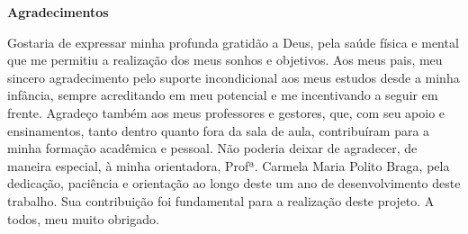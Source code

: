 
\begin{center}
\huge{{\bf Agradecimentos}}
\vspace{4cm}
\end{center}

Gostaria de expressar minha profunda gratidão a Deus, pela saúde física e mental que me permitiu a realização dos meus sonhos e objetivos. Aos meus pais, meu sincero agradecimento pelo suporte incondicional aos meus estudos desde a minha infância, sempre acreditando em meu potencial e me incentivando a seguir em frente. Agradeço também aos meus professores e gestores, que, com seu apoio e ensinamentos, tanto dentro quanto fora da sala de aula, contribuíram para a minha formação acadêmica e pessoal. Não poderia deixar de agradecer, de maneira especial, à minha orientadora, Profª. Carmela Maria Polito Braga, pela dedicação, paciência e orientação ao longo deste um ano de desenvolvimento deste trabalho. Sua contribuição foi fundamental para a realização deste projeto. A todos, meu muito obrigado.
 
\clearpage
\thispagestyle{empty}
\cleardoublepage